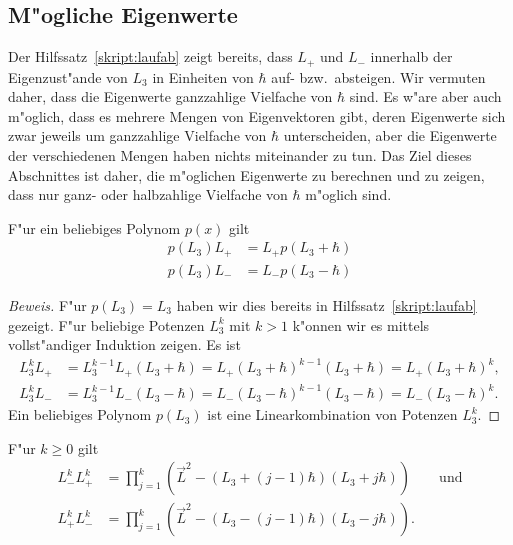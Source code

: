 \subsection{M"ogliche Eigenwerte}
Der Hilfssatz~\ref{skript:laufab} zeigt bereits, dass $L_+$ und $L_-$
innerhalb der Eigenzust"ande von $L_3$ in Einheiten von $\hbar$
auf- bzw.~absteigen. 
Wir vermuten daher, dass die Eigenwerte ganzzahlige Vielfache von $\hbar$
sind.
Es w"are aber auch m"oglich, dass es mehrere Mengen von Eigenvektoren
gibt, deren Eigenwerte sich zwar jeweils um ganzzahlige Vielfache von $\hbar$
unterscheiden, aber die Eigenwerte der verschiedenen Mengen haben nichts
miteinander zu tun.
Das Ziel dieses Abschnittes ist daher, die m"oglichen Eigenwerte zu
berechnen und zu zeigen, dass nur ganz- oder halbzahlige Vielfache von
$\hbar$ m"oglich sind.

\begin{hilfssatz}
F"ur ein beliebiges Polynom $p(x)$ gilt
\begin{align*}
p(L_3)L_+ &= L_+ p(L_3+\hbar)\\
p(L_3)L_- &= L_- p(L_3-\hbar)
\end{align*}
\end{hilfssatz}

\begin{proof}[Beweis]
F"ur $p(L_3)=L_3$ haben wir dies bereits in Hilfssatz~\ref{skript:laufab}
gezeigt.
F"ur beliebige Potenzen $L_3^k$ mit $k>1$
k"onnen wir es mittels vollst"andiger Induktion zeigen.
Es ist
\begin{align*}
L_3^kL_+ &= L_3^{k-1}L_+(L_3+\hbar) = L_+(L_3+\hbar)^{k-1}(L_3+\hbar)
= L_+(L_3+\hbar)^k,
\\
L_3^kL_- &= L_3^{k-1}L_-(L_3-\hbar) = L_-(L_3-\hbar)^{k-1}(L_3-\hbar)
= L_-(L_3-\hbar)^k.
\end{align*}
Ein beliebiges Polynom $p(L_3)$ ist eine Linearkombination von Potenzen
$L_3^k$.
\end{proof}

\begin{hilfssatz}
F"ur $k\ge 0$ gilt 
\begin{align*}
L_-^kL_+^k
&=
\prod_{j=1}^k (\vec L^2 - (L_3+(j-1)\hbar)(L_3+j\hbar))\qquad\text{und}
\\
L_+^kL_-^k
&=
\prod_{j=1}^k (\vec L^2 - (L_3-(j-1)\hbar)(L_3-j\hbar)).
\end{align*}
\end{hilfssatz}

